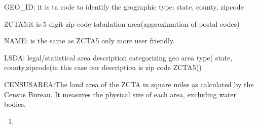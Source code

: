 \documentclass[
  letterpaper,
  DIV=11,
  numbers=noendperiod]{scrartcl}
\providecommand{\tightlist}{%
  \setlength{\itemsep}{0pt}\setlength{\parskip}{0pt}}\usepackage{longtable,booktabs,array}
\begin{document}
GEO\_ID: it is ta code to identify the grographic type: state, county,
zipcode

ZCTA5:it is 5 digit zip code tabulation area(approximation of postal
codes)

NAME: is the same as ZCTA5 only more user friendly.

LSDA: legal/statistical area description categorizing geo area type(
state, county,zipcode(in this case our description is zip code ZCTA5))

CENSUSAREA:The land area of the ZCTA in square miles as calculated by
the Census Bureau. It measures the physical size of each area, excluding
water bodies.

\begin{enumerate}
\def\labelenumi{\arabic{enumi}.}
\setcounter{enumi}{1}
\tightlist
\item
\end{enumerate}
\end{document}
